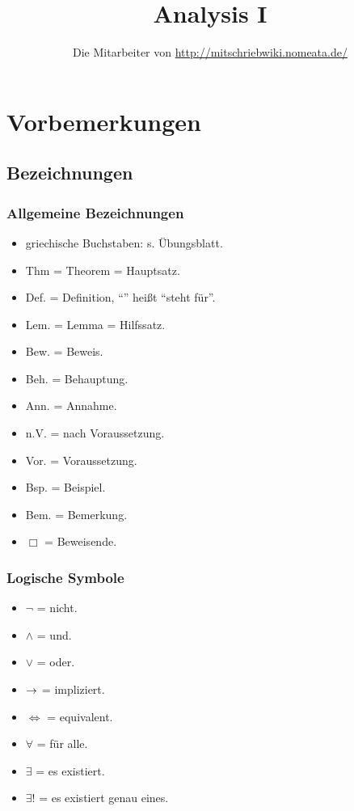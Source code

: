 \documentclass[12pt]{scrreprt}
\author{Die Mitarbeiter von \url{http://mitschriebwiki.nomeata.de/}}
\title{Analysis I}
\begin{document}
\maketitle

\tableofcontents

\setcounter{chapter}{-1}
\chapter{Vorbemerkungen}
\label{cha:vor}

\section{Bezeichnungen}
\label{sec:vor.bezeichnungen}
\subsection*{Allgemeine Bezeichnungen}

\begin{itemize}
\item griechische Buchstaben: s. Übungsblatt.
\item Thm = Theorem = Hauptsatz.
\item Def. = Definition, "`{\da}"' heißt "`steht für"'.
\item Lem. = Lemma = Hilfssatz.
\item Bew. = Beweis.
\item Beh. = Behauptung.
\item Ann. = Annahme.
\item n.V. = nach Voraussetzung.
\item Vor. = Voraussetzung.
\item Bsp. = Beispiel.
\item Bem. = Bemerkung.
\item $\Box$ = Beweisende.
\end{itemize}

\subsection*{Logische Symbole}
\begin{itemize}
\item $\neg$ = nicht.
\item $\wedge$ = und.
\item $\vee$ = oder.
\item $\rightarrow$ = impliziert.
\item $\Longleftrightarrow$ = equivalent.
\item $\forall$ = für alle.
\item $\exists$ = es existiert.
\item $\exists!$ = es existiert genau eines.
\end{itemize}
\end{document}
